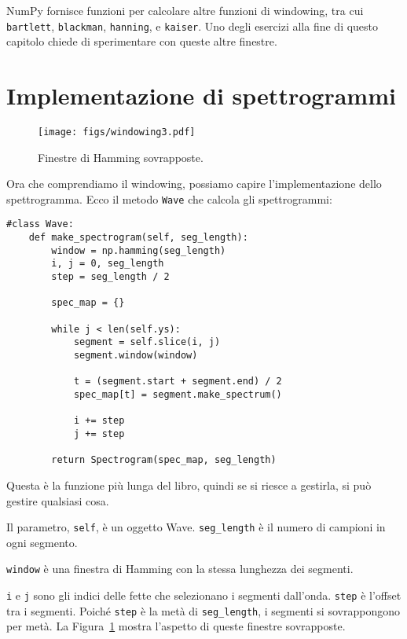 \documentclass[12pt,a4paper]{book}
\begin{document}
NumPy fornisce funzioni per calcolare altre funzioni di windowing, tra cui {\tt bartlett}, {\tt blackman}, {\tt hanning}, e {\tt kaiser}. Uno degli esercizi alla fine di questo capitolo chiede di sperimentare con queste altre finestre.

\section{Implementazione di spettrogrammi} 

\begin{figure} 

\centerline{\texttt{[image: figs/windowing3.pdf]}} \caption{Finestre di Hamming sovrapposte.} \label{fig.windowing3} \end{figure} 

Ora che comprendiamo il windowing, possiamo capire l'implementazione dello spettrogramma. Ecco il metodo {\tt Wave} che calcola gli spettrogrammi:

\begin{verbatim} 
#class Wave:
    def make_spectrogram(self, seg_length):
        window = np.hamming(seg_length)
        i, j = 0, seg_length
        step = seg_length / 2

        spec_map = {}

        while j < len(self.ys):
            segment = self.slice(i, j)
            segment.window(window)

            t = (segment.start + segment.end) / 2
            spec_map[t] = segment.make_spectrum()

            i += step
            j += step

        return Spectrogram(spec_map, seg_length)
 \end{verbatim} 

Questa è la funzione più lunga del libro, quindi se si riesce a gestirla, si può gestire qualsiasi cosa.

Il parametro, {\tt self}, è un oggetto Wave. \verb"seg_length" è il numero di campioni in ogni segmento.

{\tt window} è una finestra di Hamming con la stessa lunghezza dei segmenti.

{\tt i} e {\tt j} sono gli indici delle fette che selezionano i segmenti dall'onda. {\tt step} è l'offset tra i segmenti. Poiché {\tt step} è la metà di \verb"seg_length", i segmenti si sovrappongono per metà. La Figura~\ref{fig.windowing3} mostra l'aspetto di queste finestre sovrapposte.
\end{document}

